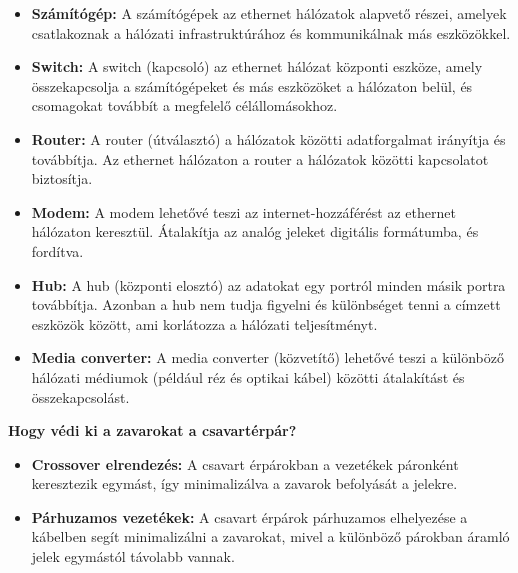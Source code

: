 \documentclass[11pt,a4paper]{article}
\begin{document}
            \begin{tcolorbox}[colback=blue!5!white,colframe=blue!50!black,title= 41. Ismertesse az ethernet hálózaton használt eszközöket!]  
                                        \begin{itemize}
                                            \item \textbf{Számítógép:} A számítógépek az ethernet hálózatok alapvető részei, amelyek csatlakoznak a hálózati infrastruktúrához és kommunikálnak más eszközökkel.
                                            \item \textbf{Switch:} A switch (kapcsoló) az ethernet hálózat központi eszköze, amely összekapcsolja a számítógépeket és más eszközöket a hálózaton belül, és csomagokat továbbít a megfelelő célállomásokhoz.
                                            \item \textbf{Router:} A router (útválasztó) a hálózatok közötti adatforgalmat irányítja és továbbítja. Az ethernet hálózaton a router a hálózatok közötti kapcsolatot biztosítja.
                                            \item \textbf{Modem:} A modem lehetővé teszi az internet-hozzáférést az ethernet hálózaton keresztül. Átalakítja az analóg jeleket digitális formátumba, és fordítva.
                                            \item \textbf{Hub:} A hub (központi elosztó) az adatokat egy portról minden másik portra továbbítja. Azonban a hub nem tudja figyelni és különbséget tenni a címzett eszközök között, ami korlátozza a hálózati teljesítményt.
                                            \item \textbf{Media converter:} A media converter (közvetítő) lehetővé teszi a különböző hálózati médiumok (például réz és optikai kábel) közötti átalakítást és összekapcsolást.
                                        \end{itemize}
                                        \textbf{Hogy védi ki a zavarokat a csavartérpár?}
                                        \begin{itemize}
                                            \item \textbf{Crossover elrendezés:} A csavart érpárokban a vezetékek páronként keresztezik egymást, így minimalizálva a zavarok befolyását a jelekre.
                                            \item \textbf{Párhuzamos vezetékek:} A csavart érpárok párhuzamos elhelyezése a kábelben segít minimalizálni a zavarokat, mivel a különböző párokban áramló jelek egymástól távolabb vannak.

\end{itemize}
\end{tcolorbox}
\end{document}
